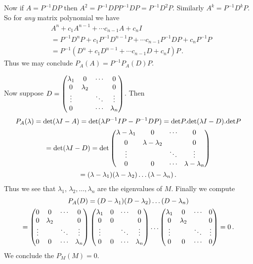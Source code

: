 \begin{enumerate}
Now if $A=P^{-1}DP$ then $A^2=P^{-1}DPP^{-1}DP=P^{-1}D^2P$. Similarly $A^k=P^{-1} D^k P$. So for {\itshape any} matrix polynomial we have
\begin{align*}
& A^n + c_1 A^{n-1} + \cdots c_{n-1} A + c_n I \\
&= P^{-1}D^nP + c_1 P^{-1}D^{n-1}P + \cdots c_{n-1} P^{-1}DP + c_n P^{-1}P \\
&= P^{-1}( D^n + c_1 D^{n-1} + \cdots c_{n-1} D + c_n I)P\, .
\end{align*}
Thus we may conclude $P_A(A)=P^{-1} P_A(D) P$. 

Now suppose 
$D=\begin{pmatrix}\lambda_1 & \mc0 &\cdots & \mc0 \\ \mc0 &\lambda_2 & &\mc 0\\ \mc\vdots& & \ddots &\mc\vdots \\ \mc0 &&\cdots    &\lambda_n \end{pmatrix}$. Then 
\begin{gather*}P_A(\lambda) = {\rm det} (\lambda I - A) = {\rm det} (\lambda P^{-1} I P - P^{-1} D P) = {\rm det} P . {\rm det} (\lambda I - D). {\rm det} P\\
= {\rm det} (\lambda I - D)={\rm det}
 \begin{pmatrix}\lambda-\lambda_1 & \mc0 &\cdots & \mc0 \\[1mm] \mc0 &\lambda-\lambda_2 & &\mc 0 \\ \mc\vdots& & \ddots &\mc\vdots \\ \mc0 &\mc 0&\cdots    &\lambda-\lambda_n \end{pmatrix}\\=(\lambda-\lambda_1)(\lambda-\lambda_2)\ldots (\lambda-\lambda_n)\, .
\end{gather*}
Thus we see that $\lambda_1$, $\lambda_2, \ldots , \lambda_n$ are the eigenvalues of $M$. Finally we compute 
\begin{gather*}
P_A(D) = (D-\lambda_1)(D-\lambda_2)\ldots (D-\lambda_n)
\\
=\begin{pmatrix}\mc 0 & \mc 0 &\cdots & \mc 0 \\ \mc 0 &\lambda_2 & &\mc 0 \\ \mc\vdots& & \ddots &\mc\vdots \\ \mc 0 &\mc 0&\cdots    &\lambda_n \end{pmatrix}
\begin{pmatrix}\lambda_1 & \mc 0 &\cdots & \mc 0 \\ \mc 0 &\mc 0 & &\mc 0 \\ \mc\vdots& & \ddots &\mc\vdots \\ \mc 0 &\mc 0&\cdots    &\lambda_n \end{pmatrix}
\ldots
\begin{pmatrix}\lambda_1 & \mc 0 &\cdots & \mc 0 \\ \mc 0 &\lambda_2 & &\mc 0 \\ \mc\vdots& & \ddots & \mc\vdots\\ \mc 0 &\mc 0&\cdots    &\mc 0\end{pmatrix}
=0\, .
\end{gather*}
We conclude the $P_M(M)=0$.



\end{enumerate}
